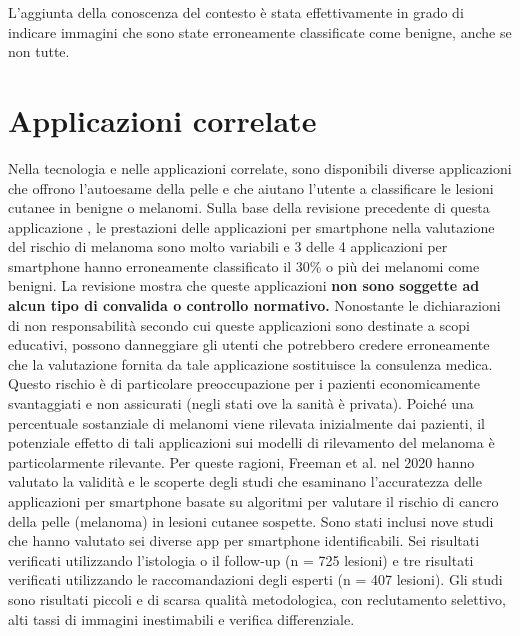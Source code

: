 {	 \newline
	 L'aggiunta della conoscenza del contesto è stata effettivamente in grado di indicare immagini che sono state erroneamente classificate come benigne, anche se non tutte.
	\section{Applicazioni correlate}
	Nella tecnologia e nelle applicazioni correlate, sono disponibili diverse applicazioni che offrono l'autoesame della pelle e che aiutano l'utente a classificare le lesioni cutanee in benigne o melanomi.
	\newline
	Sulla base della revisione precedente di questa applicazione \cite{wolf2013diagnostic}, le prestazioni delle applicazioni per smartphone nella valutazione del rischio di melanoma sono molto variabili e 3 delle 4 applicazioni per smartphone hanno erroneamente classificato il 30\% o più dei melanomi come benigni.
	\newline
	La revisione mostra che queste applicazioni \textbf{non sono soggette ad alcun tipo di convalida o controllo normativo.} Nonostante le dichiarazioni di non responsabilità secondo cui queste applicazioni sono destinate a scopi educativi, possono danneggiare gli utenti che potrebbero credere erroneamente che la valutazione fornita da tale applicazione sostituisce la consulenza medica. Questo rischio è di particolare preoccupazione per i pazienti economicamente svantaggiati e non assicurati (negli stati ove la sanità è privata). Poiché una percentuale sostanziale di melanomi viene rilevata inizialmente dai pazienti, il potenziale effetto di tali applicazioni sui modelli di rilevamento del melanoma è particolarmente rilevante.
	\newline
	Per queste ragioni, Freeman et al. \cite{freeman2020algorithm} nel 2020 hanno valutato la validità e le scoperte degli studi che esaminano l'accuratezza delle applicazioni per smartphone basate su algoritmi per valutare il rischio di cancro della pelle (melanoma) in lesioni cutanee sospette.
	\newline
	Sono stati inclusi nove studi che hanno valutato sei diverse app per smartphone identificabili. Sei risultati verificati utilizzando l'istologia o il follow-up (n = 725 lesioni) e tre risultati verificati utilizzando le raccomandazioni degli esperti (n = 407 lesioni). Gli studi sono risultati piccoli e di scarsa qualità metodologica, con reclutamento selettivo, alti tassi di immagini inestimabili e verifica differenziale.
	\newline
}
